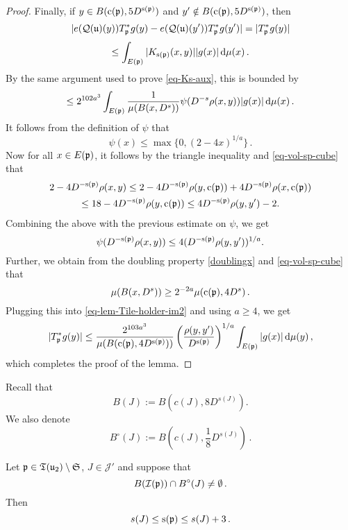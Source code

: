 \begin{proof}
        Finally, if $y \in B({\mathrm{c}}({\mathfrak p}), 5D^{{\mathrm{s}}({\mathfrak p})})$ and $y' \notin B({\mathrm{c}}({\mathfrak p}), 5D^{{\mathrm{s}}({\mathfrak p})})$, then
        $$
            |e({\mathcal{Q}}({\mathfrak u})(y)) T_{{\mathfrak p}}^* g(y) - e({\mathcal{Q}}({\mathfrak u})(y')) T_{{\mathfrak p}}^* g(y')| = |T_{{\mathfrak p}}^* g(y)|
        $$
        $$
            \le \int_{E({\mathfrak p})} |K_{{\mathrm{s}}({\mathfrak p})}(x,y)| |g(x)| \, \mathrm{d}\mu(x)\,.
        $$
        By the same argument used to prove \eqref{eq-Ks-aux}, this is bounded by
      \begin{equation}
            \label{eq-lem-Tile-holder-im2}
            \le 2^{102a^3} \int_{E({\mathfrak p})} \frac{1}{\mu(B(x, D^s))} \psi(D^{-s} \rho(x,y)) |g(x)| \, \mathrm{d}\mu(x)\,.
        \end{equation}
        It follows from the definition of $\psi$ that
        $$
            \psi(x) \le \max\{0, (2 - 4x)^{1/a}\}\,.
        $$
        Now for all $x\in E({\mathfrak p})$, it follows by the triangle inequality and \eqref{eq-vol-sp-cube} that
        \begin{multline*}
        2 - 4D^{-{\mathrm{s}}({\mathfrak p})}\rho(x,y)\leq 2 - 4D^{-{\mathrm{s}}({\mathfrak p})}\rho(y, {\mathrm{c}}({\mathfrak p})) + 4 D^{-{\mathrm{s}}({\mathfrak p})}\rho(x, {\mathrm{c}}({\mathfrak p}))\\\leq 18 - 4 D^{-{\mathrm{s}}({\mathfrak p})} \rho(y, {\mathrm{c}}({\mathfrak p})) \leq 4 D^{-{\mathrm{s}}({\mathfrak p})}\rho(y,y') - 2 .
        \end{multline*}
        Combining the above with the previous estimate on $\psi$, we get
        $$
            \psi(D^{-{\mathrm{s}}({\mathfrak p})}\rho(x,y)) \le 4 (D^{-{\mathrm{s}}({\mathfrak p})}\rho(y,y'))^{1/a}.
        $$
        Further, we obtain from the doubling property \eqref{doublingx} and \eqref{eq-vol-sp-cube} that
        $$
            \mu(B(x, D^s)) \ge 2^{-2a} \mu({\mathrm{c}}({\mathfrak p}), 4D^s)\,.
        $$
        Plugging this into \eqref{eq-lem-Tile-holder-im2} and using $a \ge 4$, we get
        $$
            |T_{{\mathfrak p}}^* g(y)| \le \frac{2^{103a^3}}{\mu(B({\mathrm{c}}({\mathfrak p}), 4D^{{\mathrm{s}}({\mathfrak p})}))} \left(\frac{\rho(y,y')}{D^{{\mathrm{s}}({\mathfrak p})}}\right)^{1/a} \int_{E({\mathfrak p})} |g(x)| \, \mathrm{d}\mu(y)\,,
        $$
        which completes the proof of the lemma.
    \end{proof}

    Recall that
    \begin{equation*}
        B(J) := B(c(J), 8D^{s(J)}).
    \end{equation*}
    We also denote
    \begin{equation*}
     B^\circ{}(J) := B(c(J), \frac{1}{8}D^{s(J)})\, .
    \end{equation*}


    \begin{lemma}
        \label{limited-scale-impact}
        \leanok
        Let ${\mathfrak p} \in {\mathfrak T}({\mathfrak u}_2) \setminus \mathfrak{S}$, $J \in \mathcal{J}'$ and suppose that
        $$
           B({\mathcal{I}}({\mathfrak p})) \cap B^\circ(J) \ne \emptyset\,.
        $$
        Then
        $$
            s(J) \le {\mathrm{s}}({\mathfrak p}) \le s(J) +3\,.
        $$
    \end{lemma}

